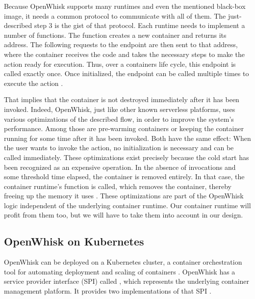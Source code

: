 Because OpenWhisk supports many runtimes and even the mentioned black-box image, it needs a common protocol to communicate with all of them. The just-described step 3 is the gist of that protocol. Each runtime needs to implement a number of functions. The  function creates a new container and returns its address. The following requests to the  endpoint are then sent to that address, where the container receives the code and takes the necessary steps to make the action ready for execution. Thus, over a containers life cycle, this endpoint is called exactly once. Once initialized, the  endpoint can be called multiple times to execute the action \cite{OpenWhiskSystemDesign}.

That implies that the container is not destroyed immediately after it has been invoked. Indeed, OpenWhisk, just like other known serverless platforms, uses various optimizations of the described flow, in order to improve the system's performance. Among those are pre-warming containers or keeping the container running for some time after it has been invoked. Both have the same effect: When the user wants to invoke the action, no initialization is necessary and  can be called immediately. These optimizations exist precisely because the cold start has been recognized as an expensive operation. In the absence of invocations and some threshold time elapsed, the container is removed entirely. In that case, the container runtime's  function is called, which removes the container, thereby freeing up the memory it uses \cite{OpenWhiskSystemDesign}. These optimizations are part of the OpenWhisk logic independent of the underlying container runtime. Our container runtime will profit from them too, but we will have to take them into account in our design.

\subsection{OpenWhisk on Kubernetes}

OpenWhisk can be deployed on a Kubernetes cluster, a container orchestration tool for automating deployment and scaling of containers \cite{Kub2021}. OpenWhisk has a service provider interface (SPI) called , which represents the underlying container management platform. It provides two implementations of that SPI \cite{OWKub2020}.

